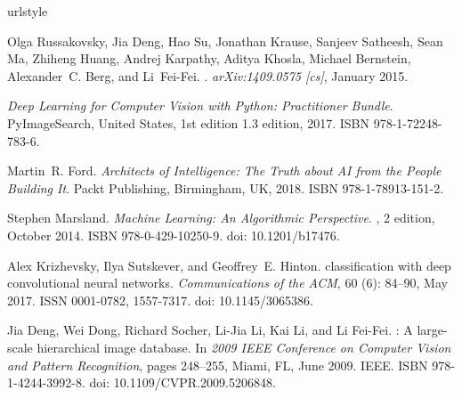\documentclass{../template/texnote}
\begin{document}
\begin{thebibliography}{6}
\providecommand{\natexlab}[1]{#1}
\providecommand{\url}[1]{\texttt{#1}}
\expandafter\ifx\csname urlstyle\endcsname\relax
  \providecommand{\doi}[1]{doi: #1}\else
  \providecommand{\doi}{doi: \begingroup \urlstyle{rm}\Url}\fi

Olga Russakovsky, Jia Deng, Hao Su, Jonathan Krause, Sanjeev Satheesh, Sean Ma, Zhiheng Huang, Andrej Karpathy, Aditya Khosla, Michael Bernstein, Alexander~C. Berg, and Li~{Fei-Fei}.
.
\newblock \emph{arXiv:1409.0575 [cs]}, January 2015.

\emph{Deep Learning for Computer Vision with {{Python}}: Practitioner Bundle}.
\newblock PyImageSearch, United States, 1st edition 1.3 edition, 2017.
\newblock ISBN 978-1-72248-783-6.

Martin~R. Ford.
\newblock \emph{Architects of Intelligence: The Truth about {{AI}} from the People Building It}.
\newblock Packt Publishing, Birmingham, UK, 2018.
\newblock ISBN 978-1-78913-151-2.

Stephen Marsland.
\newblock \emph{Machine {{Learning}}: {{An Algorithmic Perspective}}}.
, 2 edition, October 2014.
\newblock ISBN 978-0-429-10250-9.
\newblock \doi{10.1201/b17476}.

Alex Krizhevsky, Ilya Sutskever, and Geoffrey~E. Hinton.
 classification with deep convolutional neural networks.
\newblock \emph{Communications of the ACM}, 60 (6): 84--90, May 2017.
\newblock ISSN 0001-0782, 1557-7317.
\newblock \doi{10.1145/3065386}.

Jia Deng, Wei Dong, Richard Socher, Li-Jia Li, {Kai Li}, and {Li Fei-Fei}.
: {{A}} large-scale hierarchical image database.
\newblock In \emph{2009 {{IEEE Conference}} on {{Computer Vision}} and {{Pattern Recognition}}}, pages 248--255, Miami, FL, June 2009. IEEE.
\newblock ISBN 978-1-4244-3992-8.
\newblock \doi{10.1109/CVPR.2009.5206848}.

\end{thebibliography}
    \printbibliography
\end{document}
